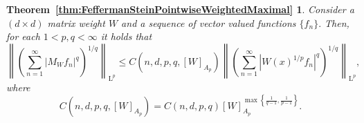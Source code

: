 \documentclass{article}
\theoremstyle{definition}
\theoremstyle{remark}
\numberwithin{equation}{section}
\newcommand{\norm}[2]{\left\|{#1}\right\|_{{#2}}}
\newcommand{\Lp}[1]{\mathrm{L}^{#1}}
\newcommand{\1}{\mathbf{1}}
\begin{document}
    \theoremstyle{plain}
    \newtheorem*{ThmMaximalPointwise}{Theorem~\ref{thm:FeffermanSteinPointwiseWeightedMaximal}}
    \begin{ThmMaximalPointwise}
        Consider a $(d \times d)$ matrix weight $W$ and a sequence of vector valued functions $\{f_n\}.$
        Then, for each $1 < p,q < \infty$ it holds that
        \begin{equation*}
            \norm{\left(\sum_{n=1}^\infty |M_W f_n|^q\right)^{1/q}}{\Lp{p}}
            \leq C(n,d,p,q,[W]_{A_p}) \norm{\left(\sum_{n=1}^\infty |W(x)^{1/p} f_n|^q\right)^{1/q}}{\Lp{p}},
        \end{equation*}
        where
        \begin{equation*}
            C(n,d,p,q,[W]_{A_p}) = C(n,d,p,q) [W]_{A_p}^{\max\left\{\frac{1}{q-1},\frac{1}{p-1}\right\}}.
        \end{equation*}
    \end{ThmMaximalPointwise}
\end{document}
